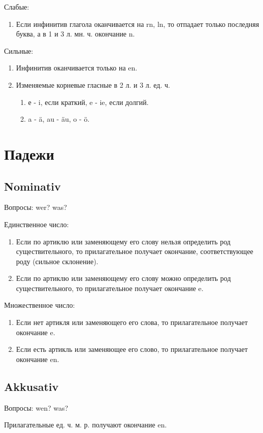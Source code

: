 \documentclass[oneside]{book}
\begin{document}
    Слабые:
    \begin{enumerate}
        \item Если инфинитив глагола оканчивается на rn, ln, то отпадает
        только последняя буква, а в 1 и 3 л. мн. ч. окончание n.
    \end{enumerate}

    Сильные:
    \begin{enumerate}
        \item Инфинитив оканчивается только на en.
        \item Изменяемые корневые гласные в 2 л. и 3 л. ед. ч.
        \begin{enumerate}
            \item е - i, если краткий, e - ie, если долгий.
            \item a - \"a, au - \"au, o - \"o.
        \end{enumerate}
    \end{enumerate}

    \chapter{Падежи}
    \section{Nominativ}
    Вопросы: wer? was?

    Единственное число:
    \begin{enumerate}
        \item Если по артиклю или заменяющему его слову нельзя определить род
        существительного, то прилагательное получает окончание, соответствующее
        роду (сильное склонение).

        \item Если по артиклю или заменяющему его слову можно определить
        род существительного, то прилагательное получает окончание e.
    \end{enumerate}

    Множественное число:
    \begin{enumerate}
        \item Если нет артикля или заменяющего его слова,
        то прилагательное получает окончание e.

        \item Если есть артикль или заменяющее его слово,
        то прилагательное получает окончание en.
    \end{enumerate}

    \section{Akkusativ}
    Вопросы: wen? was?

    Прилагательные ед. ч. м. р. получают окончание en.
\end{document}

